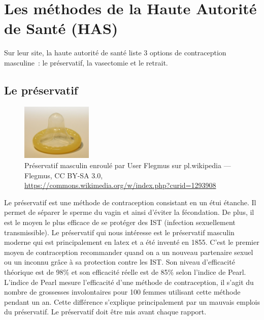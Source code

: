 \documentclass[12pt,a4paper]{report}
\begin{document}
\section{Les méthodes de la Haute Autorité de Santé (HAS)}
Sur leur site, la haute autorité de santé liste 3 options de contraception masculine : le préservatif, la vasectomie et le retrait. \cite{ContraceptionChezHomme2019}

\subsection{Le préservatif}

\begin{figure}[h]
    \centering
    \includegraphics[width=0.3\textwidth]{images/scientiphique/Kondom.jpg}
    \caption{Préservatif masculin enroulé par User Flegmus sur pl.wikipedia — Flegmus, CC BY-SA 3.0, \href{https://commons.wikimedia.org/w/index.php?curid=1293908}{https://commons.wikimedia.org/w/index.php?curid=1293908}}
    \label{fig:preservatif}
\end{figure}

Le préservatif est une méthode de contraception consistant en un étui étanche. Il permet de séparer le sperme du vagin et ainsi d'éviter la fécondation. \cite{PreservatifWikipedia}
De plus, il est le moyen le plus efficace de se protéger des IST (infection sexuellement transmissible). \cite{MaladiesInfectionsSexuellement}
Le préservatif qui nous intéresse est le préservatif masculin moderne qui est principalement en latex et a été inventé en 1855. \cite{PreservatifWikipedia}
C'est le premier moyen de contraception recommander quand on a un nouveau partenaire sexuel ou un inconnu grâce à sa protection contre les IST. \cite{PreventionIST}
Son niveau d'efficacité théorique est de 98\% et son efficacité réelle est de 85\% selon l'indice de Pearl. L'indice de Pearl mesure l'efficacité d'une méthode de contraception, il s'agit du nombre de grossesses involontaires pour 100 femmes utilisant cette méthode pendant un an.\cite{EfficaciteMoyensContraceptifs}
Cette différence s'explique principalement par un mauvais emplois du préservatif.
Le préservatif doit être mis avant chaque rapport. \cite{TousMoyensContraception2023} 
\end{document}
